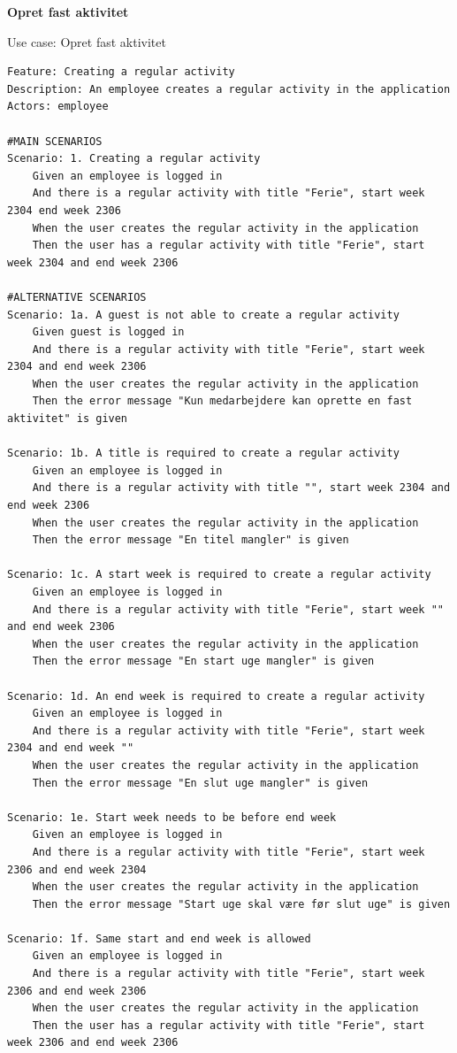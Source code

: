 \textbf{Opret fast aktivitet}
\begin{listing}[H]
    \centering
    \caption{Use case: Opret fast aktivitet}\label{lst:usecase_regular_activity}
    \begin{verbatim}  
Feature: Creating a regular activity
Description: An employee creates a regular activity in the application
Actors: employee

#MAIN SCENARIOS
Scenario: 1. Creating a regular activity
    Given an employee is logged in
    And there is a regular activity with title "Ferie", start week 2304 end week 2306 
    When the user creates the regular activity in the application 
    Then the user has a regular activity with title "Ferie", start week 2304 and end week 2306

#ALTERNATIVE SCENARIOS
Scenario: 1a. A guest is not able to create a regular activity
    Given guest is logged in
    And there is a regular activity with title "Ferie", start week 2304 and end week 2306   
    When the user creates the regular activity in the application 
    Then the error message "Kun medarbejdere kan oprette en fast aktivitet" is given

Scenario: 1b. A title is required to create a regular activity
    Given an employee is logged in
    And there is a regular activity with title "", start week 2304 and end week 2306 
    When the user creates the regular activity in the application 
    Then the error message "En titel mangler" is given

Scenario: 1c. A start week is required to create a regular activity
    Given an employee is logged in
    And there is a regular activity with title "Ferie", start week "" and end week 2306 
    When the user creates the regular activity in the application 
    Then the error message "En start uge mangler" is given

Scenario: 1d. An end week is required to create a regular activity
    Given an employee is logged in
    And there is a regular activity with title "Ferie", start week 2304 and end week "" 
    When the user creates the regular activity in the application 
    Then the error message "En slut uge mangler" is given

Scenario: 1e. Start week needs to be before end week
    Given an employee is logged in
    And there is a regular activity with title "Ferie", start week 2306 and end week 2304 
    When the user creates the regular activity in the application 
    Then the error message "Start uge skal være før slut uge" is given

Scenario: 1f. Same start and end week is allowed
    Given an employee is logged in
    And there is a regular activity with title "Ferie", start week 2306 and end week 2306 
    When the user creates the regular activity in the application 
    Then the user has a regular activity with title "Ferie", start week 2306 and end week 2306
    \end{verbatim}
\end{listing}
